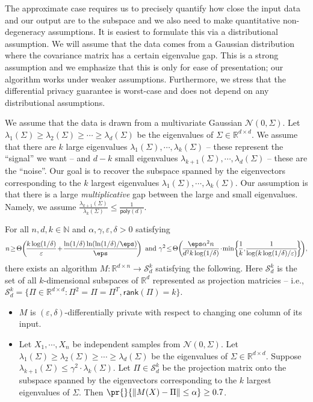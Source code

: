 The approximate case requires us to precisely quantify how close the input data and our output are to the subspace and we also need to make quantitative non-degeneracy assumptions. It is easiest to formulate this via a distributional assumption. We will assume that the data comes from a Gaussian distribution where the covariance matrix has a certain eigenvalue gap. This is a strong assumption and we emphasize that this is only for ease of presentation; our algorithm works under weaker assumptions. Furthermore, we stress that the differential privacy guarantee is worst-case and does not depend on any distributional assumptions.

We assume that the data is drawn from a multivariate Gaussian $\mathcal{N}(0,\Sigma)$. Let $\lambda_1(\Sigma) \ge \lambda_2(\Sigma) \ge \cdots \ge \lambda_d(\Sigma)$ be the eigenvalues of $\Sigma \in \mathbb{R}^{d \times d}$. We assume that there are $k$ large eigenvalues $\lambda_1(\Sigma), \cdots, \lambda_k(\Sigma)$ -- these represent the ``signal'' we want -- and $d-k$ small eigenvalues $\lambda_{k+1}(\Sigma), \cdots, \lambda_d(\Sigma)$ --  these are the ``noise''. Our goal is to recover the subspace spanned by the eigenvectors corresponding to the $k$ largest eigenvalues $\lambda_1(\Sigma), \cdots, \lambda_k(\Sigma)$.
Our assumption is that there is a large \emph{multiplicative} gap between the large and small eigenvalues. Namely, we assume $\frac{\lambda_{k+1}(\Sigma)}{\lambda_{k}(\Sigma)} \le \frac{1}{\mathsf{poly}(d)}$. 

\begin{theorem}\label{thm:intro-main-approx}
    For all $n,d,k \in \mathbb{N}$ and $\alpha,\gamma,\varepsilon, \delta > 0$ satisfying
    \[n \!\ge\! \Theta\!\left(\!\frac{k\log(1/\delta)}{\varepsilon} \!+\!
        \frac{\ln(1/\delta)\ln(\ln(1/\delta)/\eps)}{\eps}\!\right)
    ~\text{and}~
    \gamma^2 \!\le\! \Theta\!\left(\!\frac{\eps\alpha^2n}{d^2k\log(1/\delta)}\!\cdot\!\min\!\left\{\!\frac{1}{k},\!
        \frac{1}{\log(k\log(1/\delta)/\varepsilon)}\!\right\}\!\right)\!,\]
    there exists an algorithm $M : \mathbb{R}^{d \times n} \to \mathcal{S}_d^k$ satisfying the following. Here $\mathcal{S}_d^k$ is the set of all $k$-dimensional subspaces of $\mathbb{R}^d$ represented as projection matricies -- i.e., $\mathcal{S}_d^k = \{\Pi \in \mathbb{R}^{d \times d} : \Pi^2=\Pi=\Pi^T, \mathsf{rank}(\Pi)=k\}$.
\begin{itemize}
    \item $M$ is $(\varepsilon,\delta)$-differentially private with respect to changing one column of its input.
    \item Let $X_1, \cdots, X_n$ be independent samples from $\mathcal{N}(0,\Sigma)$. Let $\lambda_1(\Sigma) \ge \lambda_2(\Sigma) \ge \cdots \ge \lambda_d(\Sigma)$ be the eigenvalues of $\Sigma \in \mathbb{R}^{d \times d}$. Suppose $\lambda_{k+1}(\Sigma) \le \gamma^2 \cdot \lambda_k(\Sigma)$. Let $\Pi \in \mathcal{S}_d^k$ be the projection matrix onto the subspace spanned by the eigenvectors corresponding to the $k$ largest eigenvalues of $\Sigma$. Then $\pr{}{\|M(X)-\Pi\| \le \alpha} \ge 0.7$.
\end{itemize}
\end{theorem}

